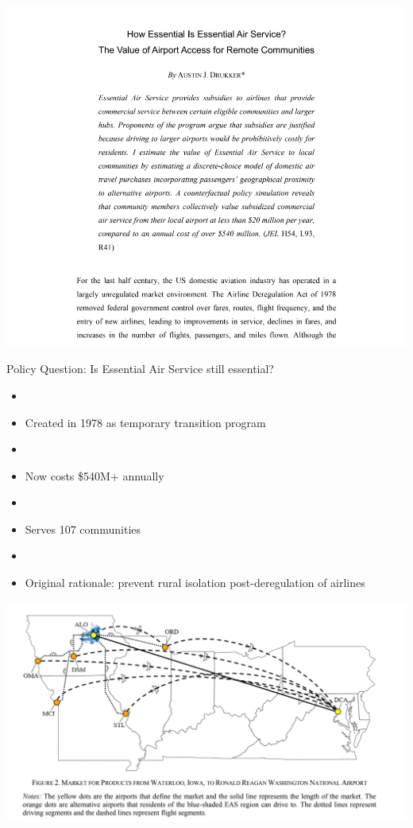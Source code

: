 \documentclass[aspectratio=169]{beamer}
\begin{document}
\begin{frame}
\includegraphics[width=\textwidth]{EAScover.jpg}
\end{frame}


\begin{frame}

\begin{center}
Policy Question: Is Essential Air Service still essential?
\end{center}

\begin{itemize}
\item[]
\item Created in 1978 as temporary transition program
\item[]
\item Now costs \$540M+ annually 
\item[]
\item Serves 107 communities
\item[]
\item Original rationale: prevent rural isolation post-deregulation of airlines
\end{itemize}

\end{frame}



\begin{frame}
\centering
\includegraphics[width=.9\textwidth]{EASfig2.jpg}
\end{frame}
\end{document}
